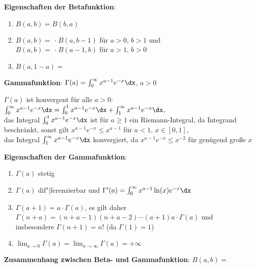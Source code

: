 \textbf{Eigenschaften der Betafunktion}:
\begin{enumerate}
    \item
    $B(a, b) = B(b, a)$

    \item
    $B(a, b) =$
     $\cdot\; B(a, b - 1)$
    für $a > 0$, $b > 1$ und \\
    $B(a, b) =$
     $\cdot\; B(a - 1, b)$
    für $a > 1$, $b > 0$

    \item
    $B(a, 1 - a) =$
\end{enumerate}

\linie

\textbf{Gammafunktion}:
$\Gamma(a) = \int_0^\infty x^{a-1} e^{-x} \dx$, $a > 0$

$\Gamma(a)$ ist konvergent für alle $a > 0$: \\
$\int_0^\infty x^{a-1} e^{-x} \dx = \int_0^1 x^{a-1} e^{-x} \dx +
\int_1^\infty x^{a-1} e^{-x} \dx$, \\
das Integral $\int_0^1 x^{a-1} e^{-x} \dx$ ist für
$a \ge 1$ ein Riemann-Integral, da Integrand beschränkt,
sonst gilt $x^{a-1} e^{-x} \le x^{a-1}$ für $a < 1$, $x \in [0,1]$, \\
das Integral $\int_1^\infty x^{a-1} e^{-x} \dx$ konvergiert, da
$x^{a-1} e^{-x} \le x^{-2}$ für genügend große $x$

\textbf{Eigenschaften der Gammafunktion}:
\begin{enumerate}
    \item
    $\Gamma(a)$ stetig

    \item
    $\Gamma(a)$ dif"|ferenzierbar und
    $\Gamma'(a) = \int_0^\infty x^{a-1} \ln(x) e^{-x} \dx$

    \item
    $\Gamma(a + 1) = a \cdot \Gamma(a)$, es gilt daher
    $\Gamma(n + a) = (n + a - 1) (n + a - 2) \dotsm (a + 1) a \cdot \Gamma(a)$
    und insbesondere $\Gamma(n + 1) = n!$
    (da $\Gamma(1) = 1$)

    \item
    $\lim_{a \to 0} \Gamma(a) = \lim_{a \to \infty} \Gamma(a) = +\infty$
\end{enumerate}

\linie

\textbf{Zusammenhang zwischen Beta- und Gammafunktion}:
$B(a, b) =$ 

